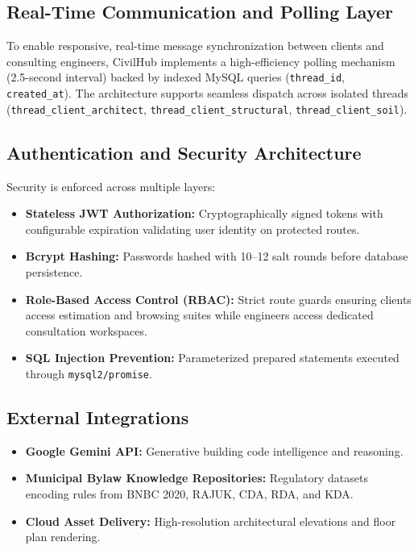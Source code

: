 \documentclass[12pt,a4paper]{article}
\begin{document}
\subsection{Real-Time Communication and Polling Layer}
To enable responsive, real-time message synchronization between clients and consulting engineers, CivilHub implements a high-efficiency polling mechanism (2.5-second interval) backed by indexed MySQL queries (\texttt{thread\_id}, \texttt{created\_at}). The architecture supports seamless dispatch across isolated threads (\texttt{thread\_client\_architect}, \texttt{thread\_client\_structural}, \texttt{thread\_client\_soil}).

\subsection{Authentication and Security Architecture}
Security is enforced across multiple layers:
\begin{itemize}
    \item \textbf{Stateless JWT Authorization:} Cryptographically signed tokens with configurable expiration validating user identity on protected routes.
    \item \textbf{Bcrypt Hashing:} Passwords hashed with 10–12 salt rounds before database persistence.
    \item \textbf{Role-Based Access Control (RBAC):} Strict route guards ensuring clients access estimation and browsing suites while engineers access dedicated consultation workspaces.
    \item \textbf{SQL Injection Prevention:} Parameterized prepared statements executed through \texttt{mysql2/promise}.
\end{itemize}

\subsection{External Integrations}
\begin{itemize}
    \item \textbf{Google Gemini API:} Generative building code intelligence and reasoning.
    \item \textbf{Municipal Bylaw Knowledge Repositories:} Regulatory datasets encoding rules from BNBC 2020, RAJUK, CDA, RDA, and KDA.
    \item \textbf{Cloud Asset Delivery:} High-resolution architectural elevations and floor plan rendering.
\end{itemize}
\end{document}

